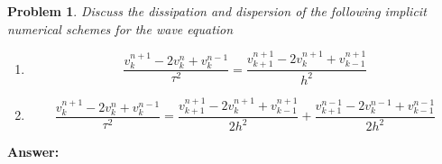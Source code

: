 \documentclass[a4paper,12pt]{article}
\newtheorem{prob}{Problem}[]
\begin{document}
\begin{prob}
	Discuss the dissipation and dispersion of the following implicit numerical schemes for the wave equation
	\begin{enumerate}
		\item \begin{equation}\label{eq:21}
		\frac{v_k^{n+1} -2v_k^n+v_k^{n-1}}{\tau^2} = \frac{v_{k+1}^{n+1}-2v_k^{n+1}+v_{k-1}^{n+1}}{h^2}
		\end{equation}
		\item \begin{equation}\label{eq:22}
		\frac{v_k^{n+1} -2v_k^n+v_k^{n-1}}{\tau^2} = \frac{v_{k+1}^{n+1}-2v_k^{n+1}+v_{k-1}^{n+1}}{2h^2} + \frac{v_{k+1}^{n-1}-2v_k^{n-1}+v_{k-1}^{n-1}}{2h^2}
		\end{equation}
	\end{enumerate}
\end{prob}
\textbf{Answer:}
\end{document}
